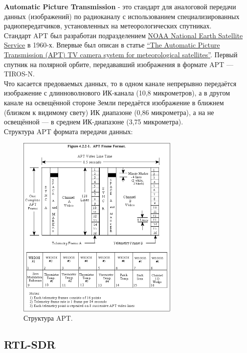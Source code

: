 \documentclass[a4paper, 14pt, titlepage, fleqn]{extarticle}
\begin{document}
	\textbf{Automatic Picture Transmission} - это стандарт для аналоговой передачи данных (изображений) по радиоканалу с использованием специализированных радиопередатчиков, установленных на метеорологических спутниках. \\ 
	
	\noindent Стандарт APT был разработан подразделением \href{https://www.noaa.gov/}{NOAA National Earth Satellite Service} в 1960-х. Впервые был описан в статье \href{https://ntrs.nasa.gov/api/citations/19630013799/downloads/19630013799.pdf}{``The Automatic Picture Transmission (APT) TV camera system for meteorological satellites''}. Первый спутник на полярной орбите, передававший изображения в формате APT — TIROS-N. \\
	
	\noindent Что касается предоваемых данных, то в одном канале непрерывно передаётся изображение с длинноволнового ИК-канала (10,8 микрометров), а в другом канале на освещённой стороне Земли передаётся изображение в ближнем (близком к видимому свету) ИК диапазоне (0,86 микрометра), а на не освещённой — в среднем ИК-диапазоне (3,75 микрометра). \\
	
	\noindent Структура APT формата передачи данных:
	
	\begin{figure}[H]
		\centering
		\includegraphics[width=300px]{apt_format.png}
		\caption{Структура APT.}
	\end{figure}
	
	\pagebreak
	\subsection*{RTL-SDR}
	
\end{document}
